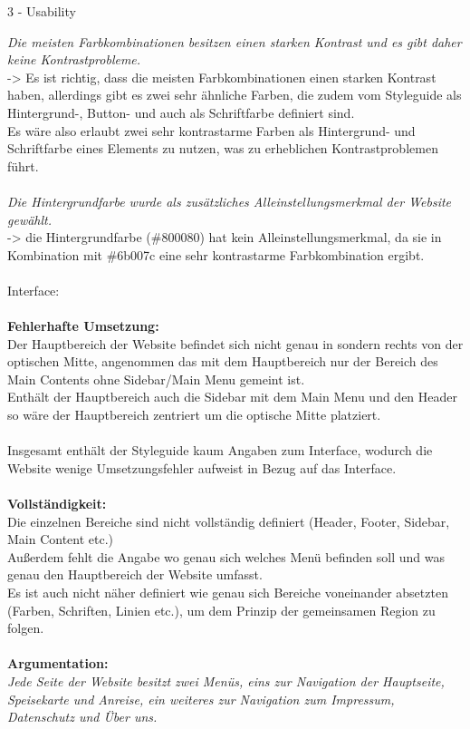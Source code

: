 \documentclass[a4paper]{article}
\begin{document}
\begin{exercise}{3 - Usability}
\begin{itemize}
\textit{Die meisten Farbkombinationen besitzen einen starken Kontrast und es gibt daher keine Kontrastprobleme. }\\
-> Es ist richtig, dass die meisten Farbkombinationen einen starken Kontrast haben, allerdings gibt es zwei sehr ähnliche Farben, die zudem vom Styleguide als Hintergrund-, Button- und auch als Schriftfarbe definiert sind.\\
Es wäre also erlaubt zwei sehr kontrastarme Farben als Hintergrund- und Schriftfarbe eines Elements zu nutzen, was zu erheblichen Kontrastproblemen führt.\\\\
\textit{Die Hintergrundfarbe wurde als zusätzliches Alleinstellungsmerkmal der Website gewählt. }\\
-> die Hintergrundfarbe (\#800080) hat kein Alleinstellungsmerkmal, da sie in Kombination mit \#6b007c eine sehr kontrastarme Farbkombination ergibt.\\\\
{\Large Interface:}\\\\
\textbf{Fehlerhafte Umsetzung:}\\
Der Hauptbereich der Website befindet sich nicht genau in sondern rechts von der optischen Mitte, angenommen das mit dem Hauptbereich nur der Bereich des Main Contents ohne Sidebar/Main Menu gemeint ist.\\
Enthält der Hauptbereich auch die Sidebar mit dem Main Menu und den Header so wäre der Hauptbereich zentriert um die optische Mitte platziert.\\\\
Insgesamt enthält der Styleguide kaum Angaben zum Interface, wodurch die Website wenige Umsetzungsfehler aufweist in Bezug auf das Interface.\\\\
\textbf{Vollständigkeit:}\\
Die einzelnen Bereiche sind nicht vollständig definiert (Header, Footer, Sidebar, Main Content etc.)\\
Außerdem fehlt die Angabe wo genau sich welches Menü befinden soll und was genau den Hauptbereich der Website umfasst.\\
Es ist auch nicht näher definiert wie genau sich Bereiche voneinander absetzten (Farben, Schriften, Linien etc.), um dem Prinzip der gemeinsamen Region zu folgen.\\\\
\textbf{Argumentation:}\\
\textit{Jede Seite der Website besitzt zwei Menüs, eins zur Navigation der Hauptseite, Speisekarte und Anreise, ein weiteres zur Navigation zum Impressum, Datenschutz und Über uns. }\\

\end{itemize}
\end{exercise}
\end{document}
